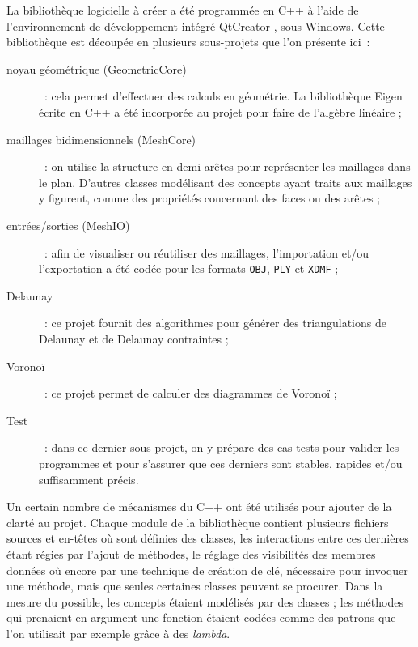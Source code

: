 \documentclass[12pt,a4paper]{report}
\begin{document}
\vspace{1cm}

La bibliothèque logicielle à créer a été programmée en C++ à l'aide de l'environnement de développement intégré QtCreator \cite{QtCreator}, sous Windows. Cette bibliothèque est découpée en plusieurs sous-projets que l'on présente ici~:
\begin{description}
\item[noyau géométrique (GeometricCore)]~: cela permet d'effectuer des calculs en géométrie. La bibliothèque Eigen \cite{Eigen} écrite en C++ a été incorporée au projet pour faire de l'algèbre linéaire ;
\item[maillages bidimensionnels (MeshCore)]~: on utilise la structure en demi-arêtes pour représenter les maillages dans le plan. D'autres classes modélisant des concepts ayant traits aux maillages y figurent, comme des propriétés concernant des faces ou des arêtes ;
\item[entrées/sorties (MeshIO)]~: afin de visualiser ou réutiliser des maillages, l'importation et/ou l'exportation a été codée pour les formats \verb+OBJ+, \verb+PLY+ et \verb+XDMF+\footnotemark {} ;
\item[Delaunay]~: ce projet fournit des algorithmes pour générer des triangulations de Delaunay et de Delaunay contraintes ;
\item[Voronoï]~: ce projet permet de calculer des diagrammes de Voronoï ;
\item[Test]~: dans ce dernier sous-projet, on y prépare des cas tests pour valider les programmes et pour s'assurer que ces derniers sont stables, rapides et/ou suffisamment précis.
\end{description}



Un certain nombre de mécanismes du C++ ont été utilisés pour ajouter de la clarté au projet. Chaque module de la bibliothèque contient plusieurs fichiers sources et en-têtes où sont définies des classes, les interactions entre ces dernières étant régies par l'ajout de méthodes, le réglage des visibilités des membres données où encore par une technique de création de clé, nécessaire pour invoquer une méthode, mais que seules certaines classes peuvent se procurer. Dans la mesure du possible, les concepts étaient modélisés par des classes ; les méthodes qui prenaient en argument une fonction étaient codées comme des patrons que l'on utilisait par exemple grâce à des \emph{lambda}.
\end{document}
